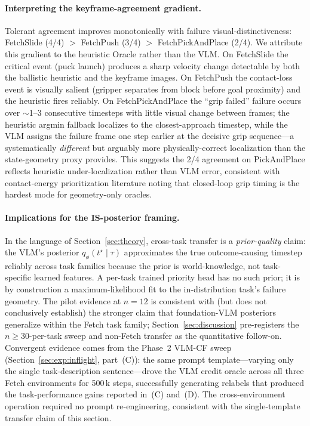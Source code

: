 \documentclass{article}
\begin{document}
\paragraph{Interpreting the keyframe-agreement gradient.}
Tolerant agreement improves monotonically with failure visual-distinctiveness:
FetchSlide (4/4) $>$ FetchPush (3/4) $>$ FetchPickAndPlace (2/4).
We attribute this gradient to the heuristic Oracle rather than the VLM.
On FetchSlide the critical event (puck launch) produces a sharp velocity change
detectable by both the ballistic heuristic and the keyframe images.
On FetchPush the contact-loss event is visually salient (gripper separates from
block before goal proximity) and the heuristic fires reliably.
On FetchPickAndPlace the ``grip failed'' failure occurs over $\sim$1--3
consecutive timesteps with little visual change between frames; the heuristic
argmin fallback localizes to the closest-approach timestep, while the VLM
assigns the failure frame one step earlier at the decisive grip
sequence---a systematically \emph{different} but arguably more
physically-correct localization than the state-geometry proxy provides.
This suggests the 2/4 agreement on PickAndPlace reflects heuristic under-localization
rather than VLM error, consistent with contact-energy prioritization literature
\citep{sayar2023cebp} noting that closed-loop grip timing is the hardest mode
for geometry-only oracles.

\paragraph{Implications for the IS-posterior framing.}
In the language of Section~\ref{sec:theory}, cross-task transfer is a
\emph{prior-quality} claim: the VLM's posterior $q_\phi(t^\star\mid\tau)$
approximates the true outcome-causing timestep reliably across task families
because the prior is world-knowledge, not task-specific learned features.
A per-task trained priority head has no such prior; it is by construction
a maximum-likelihood fit to the in-distribution task's failure geometry.
The pilot evidence at $n\!=\!12$ is consistent with (but does not conclusively
establish) the stronger claim that foundation-VLM posteriors generalize
within the Fetch task family; Section~\ref{sec:discussion} pre-registers the
$n\!\ge\!30$-per-task sweep and non-Fetch transfer as the quantitative follow-on.
Convergent evidence comes from the Phase~2 VLM-CF sweep
(Section~\ref{sec:exp:inflight}, part~(C)): the same prompt template---varying
only the single task-description sentence---drove the VLM credit oracle across
all three Fetch environments for 500\,k steps, successfully generating relabels
that produced the task-performance gains reported in~(C) and~(D). The
cross-environment operation required no prompt re-engineering, consistent with
the single-template transfer claim of this section.
\end{document}
